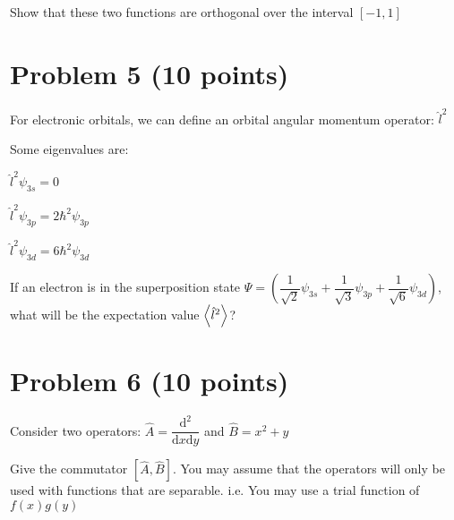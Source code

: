 \documentclass[10pt, letterpaper]{memoir}
\begin{document}
	Show that these two functions are orthogonal over the interval $[-1,1]$
	
	\vspace{22em}
	\section*{Problem 5 (10 points)}
	For electronic orbitals, we can define an orbital angular momentum operator: $\hat{l}^2$
	
	\noindent Some eigenvalues are:
	
	$\hat{l}^2\psi_{3s} = 0$
	
	$\hat{l}^2\psi_{3p} = 2 \hbar^2\psi_{3p}$
	
	$\hat{l}^2\psi_{3d} = 6 \hbar^2\psi_{3d}$
	
	\noindent
	If an electron is in the superposition state $\Psi = \left(\dfrac{1}{\sqrt{2}}\psi_{3s} + \dfrac{1}{\sqrt{3}}\psi_{3p} + \dfrac{1}{\sqrt{6}}\psi_{3d}\right)$, what will be the expectation value $\left< \hat{l}^2 \right>$?
	
	\vspace{20em}
	\section*{Problem 6 (10 points)}

	Consider two operators: $\hat{A} = \dfrac{\mathrm{d}^2}{\mathrm{d}x\mathrm{d}y}$ and $\hat{B} = x^2 + y$
	
	\noindent Give the commutator $\left[\hat{A},\hat{B}\right]$. You may assume that the operators will only be used with functions that are separable. i.e. You may use a trial function of $f(x)g(y)$
\end{document}
